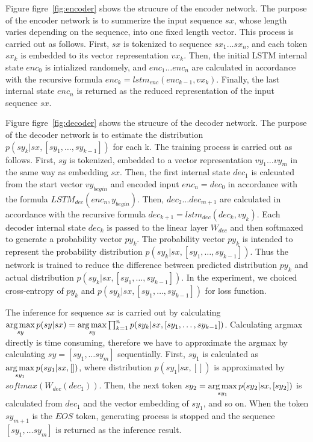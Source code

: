 \documentclass[senior,final,11pt]{iscs-thesis}
\newcommand{\argmax}{\mathop{\rm arg\,max}\limits}
\begin{document}
Figure figre~\ref{fig:encoder} shows the strucure of the encoder network.  The purpose of the encoder network is to summerize the input sequence $sx$, whose length varies depending on the sequence, into one fixed length vector.
This process is carried out as follows. 
First, $sx$ is tokenized to sequence $sx_{1} \dots sx_{n}$, and each token $sx_{k}$ is embedded to its vector representation $vx_{k}$. 
Then, the initial LSTM internal state $enc_0$ is intialized randomely, 
and $ enc_{1} \dots enc_{n} $ are calculated in accordance with the recursive formula $ enc_{k} = lstm_{enc}(enc_{k-1},vx_{k}) $.
Finally, the last internal state $ enc_{n}$ is returned as the reduced representation of the input sequence $sx$.

Figure figre~\ref{fig:decoder} shows the strucure of the decoder network.  The purpose of the decoder network is to estimate the distribution $ p(sy_k|sx,[sy_1,\dots,sy_{k-1}]) $ for each k. 
The training process is carried out as follows. 
First, $sy$ is tokenized, embedded to a vector representation $vy_{1} \dots vy_{m}$ in the same way as embedding $sx$.
Then, the first internal state $ dec_{1}$ is calcuated from the start vector $vy_{begin}$ and encoded input $ enc_{n} = dec_{0} $ in accordance with the formula  $ LSTM_{dec}(enc_{n},y_{begin}) $.
Then, $ dec_{2} \dots dec_{m+1} $ are calculated in accordance with the recursive formula $ dec_{k+1} = lstm_{dec}(dec_{k},vy_{k}) $.
Each decoder internal state $ dec_{k} $ is passed to the linear layer $ W_{dec} $ and then softmaxed to generate a probability vector $ py_{k} $.
The probability vector $ py_{k} $ is intended to represent the probability distribution $ p(sy_k|sx,[sy_1,\dots,sy_{k-1}]) $.
Thus the network is trained to reduce the difference between predicted distribution $ py_{k} $ and actual distribution $ p(sy_k|sx,[sy_1,\dots,sy_{k-1}]) $.
In the experiment, we choiced cross-entropy of $ py_{k} $ and $ p(sy_k|sx,[sy_1,\dots,sy_{k-1}]) $ for loss function.

The inference for sequence $sx$ is carried out by calculating 
$ \argmax_{sy} p(sy|sx) = \argmax_{sy} \prod_{k=1}^n p(sy_k|sx,[sy_1,\dots,sy_{k-1}]) $.
Calculating argmax directly is time consuming, therefore we have to approximate the argmax by calculating $sy = [sy_1, \dots sy_m]$ sequentially.
First, $sy_1$ is calculated as $ \argmax_{sy_1} p(sy_1|sx,[]) $, where distribution $ p(sy_1|sx,[]) $ is approximated by 
$ softmax(W_{dec}(dec_{1}))$. 
Then, the next token $sy_2 = \argmax_{sy_1} p(sy_2|sx,[sy_2]) $ is calculated from $ dec_{1} $ and the vector embedding of $sy_1$, and so on.
When the token $sy_{m+1}$ is the $ EOS $ token, generating process is stopped and the sequence $ [sy_1, \dots sy_m]$ is returned as the inference result.
\end{document}
